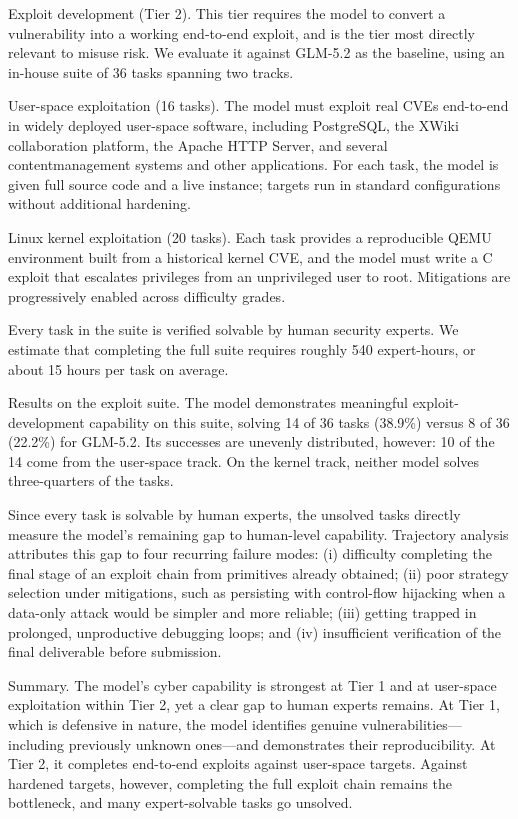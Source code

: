 \documentclass[
  10
]{article}
\begin{document}
Exploit development (Tier 2). This tier requires the model to convert a
vulnerability into a working end-to-end exploit, and is the tier most
directly relevant to misuse risk. We evaluate it against GLM-5.2 as the
baseline, using an in-house suite of 36 tasks spanning two tracks.

User-space exploitation (16 tasks). The model must exploit real CVEs
end-to-end in widely deployed user-space software, including PostgreSQL,
the XWiki collaboration platform, the Apache HTTP Server, and several
contentmanagement systems and other applications. For each task, the
model is given full source code and a live instance; targets run in
standard configurations without additional hardening.

Linux kernel exploitation (20 tasks). Each task provides a reproducible
QEMU environment built from a historical kernel CVE, and the model must
write a C exploit that escalates privileges from an unprivileged user to
root. Mitigations are progressively enabled across difficulty grades.

Every task in the suite is verified solvable by human security experts.
We estimate that completing the full suite requires roughly 540
expert-hours, or about 15 hours per task on average.

Results on the exploit suite. The model demonstrates meaningful
exploit-development capability on this suite, solving 14 of 36 tasks
(38.9\%) versus 8 of 36 (22.2\%) for GLM-5.2. Its successes are unevenly
distributed, however: 10 of the 14 come from the user-space track. On
the kernel track, neither model solves three-quarters of the tasks.

Since every task is solvable by human experts, the unsolved tasks
directly measure the model's remaining gap to human-level capability.
Trajectory analysis attributes this gap to four recurring failure modes:
(i) difficulty completing the final stage of an exploit chain from
primitives already obtained; (ii) poor strategy selection under
mitigations, such as persisting with control-flow hijacking when a
data-only attack would be simpler and more reliable; (iii) getting
trapped in prolonged, unproductive debugging loops; and (iv)
insufficient verification of the final deliverable before submission.

Summary. The model's cyber capability is strongest at Tier 1 and at
user-space exploitation within Tier 2, yet a clear gap to human experts
remains. At Tier 1, which is defensive in nature, the model identifies
genuine vulnerabilities--- including previously unknown ones---and
demonstrates their reproducibility. At Tier 2, it completes end-to-end
exploits against user-space targets. Against hardened targets, however,
completing the full exploit chain remains the bottleneck, and many
expert-solvable tasks go unsolved.
\end{document}
